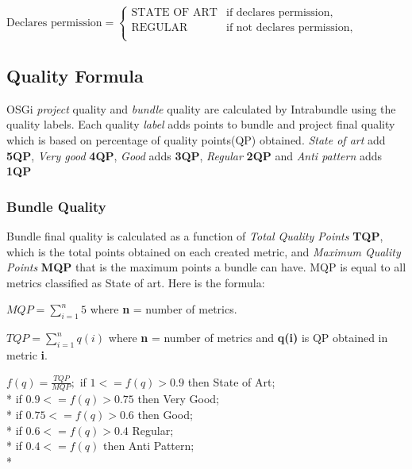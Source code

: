 \(\text{Declares permission}=\begin{cases}
\text{STATE OF ART}& \text{if declares permission},\\
\text{REGULAR}& \text{if not declares permission}, \\
\end{cases} \)  \newline

\subsection{Quality Formula}

OSGi \emph{project} quality and \emph{bundle} quality are calculated by Intrabundle using the quality labels. Each quality \emph{label} adds points to bundle and project final quality which is based on percentage of quality points(QP) obtained. \emph{State of art} add \textbf{5QP}, \emph{Very good} \textbf{4QP}, \emph{Good} adds \textbf{3QP}, \emph{Regular} \textbf{2QP} and \emph{Anti pattern} adds \textbf{1QP}

\subsubsection{Bundle Quality}
Bundle final quality is calculated as a function of \emph{Total Quality Points} \textbf{TQP}, which is the total points obtained on each created metric, and \emph{Maximum Quality Points} \textbf{MQP} that is the maximum points a bundle can have. MQP is equal to all metrics classified as State of art. Here is the formula:\newline    

\(MQP = \sum_{i=1}^{n} 5 \) where \textbf{n} = number of metrics. \newline

\(TQP = \sum_{i=1}^{n} q(i) \) where \textbf{n} = number of metrics and \textbf{q(i)} is QP obtained in metric \textbf{i}. \newline

 
\(
f(q) = \frac{TQP}{MQP};
\)
\newline
\newline
 if \( 1 <= f(q) > 0.9 \) then State of Art; \\*
 if \( 0.9 <= f(q) > 0.75 \) then Very Good; \\*
 if \( 0.75 <= f(q) > 0.6 \) then Good; \\*
 if \( 0.6 <= f(q) > 0.4 \) Regular; \\*
 if \( 0.4 <= f(q) \) then Anti Pattern;\\*


